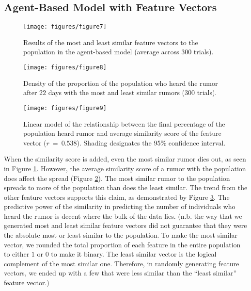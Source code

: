 \subsection{Agent-Based Model with Feature Vectors}
\label{subsec:featvect}

\begin{figure}[H]
\captionsetup{width=0.8\textwidth}
\centering
    \texttt{[image: figures/figure7]}
  \caption{ Results of the most and least similar feature vectors to the population in the agent-based model (average across $ 300 $ trials). }
  \label{fig:figure7}
\end{figure}

\begin{figure}[H]
\captionsetup{width=0.8\textwidth}
\centering
    \texttt{[image: figures/figure8]}
  \caption{ Density of the proportion of the population who heard the rumor after $ 22 $ days with the most and least similar rumors ($ 300 $ trials). }
  \label{fig:figure8}
\end{figure}

\begin{figure}[H]
\captionsetup{width=0.8\textwidth}
\centering
    \texttt{[image: figures/figure9]}
  \caption{ Linear model of the relationship between the final percentage of the population heard rumor and average similarity score of the feature vector ($ r~=~0.538 $). Shading designates the 95\% confidence interval. }
  \label{fig:figure9}
\end{figure}

When the similarity score is added, even the most similar rumor dies out, as seen in Figure \ref{fig:figure7}. However, the average similarity score of a rumor with the population does affect the spread (Figure \ref{fig:figure8}). The most similar rumor to the population spreads to more of the population than does the least similar. The trend from the other feature vectors supports this claim, as demonstrated by Figure \ref{fig:figure9}. The predictive power of the similarity in predicting the number of individuals who heard the rumor is decent where the bulk of the data lies. (n.b. the way that we generated most and least similar feature vectors did not guarantee that they were the absolute most or least similar to the population. To make the most similar vector, we rounded the total proportion of each feature in the entire population to either $ 1 $ or $ 0 $ to make it binary. The least similar vector is the logical complement of the most similar one. Therefore, in randomly generating feature vectors, we ended up with a few that were less similar than the ``least similar'' feature vector.)
